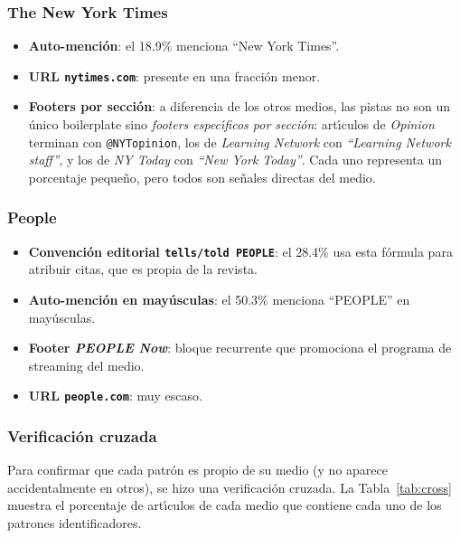 \documentclass[11pt,a4paper]{article}
\begin{document}
\subsubsection*{The New York Times}
\begin{itemize}
    \item \textbf{Auto-menci\'{o}n}: el 18.9\% menciona ``New York Times''.
    \item \textbf{URL \texttt{nytimes.com}}: presente en una fracci\'{o}n menor.
    \item \textbf{Footers por secci\'{o}n}: a diferencia de los otros medios, las pistas no son un \'{u}nico boilerplate sino \textit{footers espec\'{\i}ficos por secci\'{o}n}: art\'{\i}culos de \textit{Opinion} terminan con \texttt{@NYTopinion}, los de \textit{Learning Network} con \textit{``Learning Network staff''}, y los de \textit{NY Today} con \textit{``New York Today''}. Cada uno representa un porcentaje peque\~{n}o, pero todos son se\~{n}ales directas del medio.
\end{itemize}

\subsubsection*{People}
\begin{itemize}
    \item \textbf{Convenci\'{o}n editorial \texttt{tells/told PEOPLE}}: el 28.4\% usa esta f\'{o}rmula para atribuir citas, que es propia de la revista.
    \item \textbf{Auto-menci\'{o}n en may\'{u}sculas}: el 50.3\% menciona ``PEOPLE'' en may\'{u}sculas.
    \item \textbf{Footer \textit{PEOPLE Now}}: bloque recurrente que promociona el programa de streaming del medio.
    \item \textbf{URL \texttt{people.com}}: muy escaso.
\end{itemize}

\subsubsection*{Verificaci\'{o}n cruzada}

Para confirmar que cada patr\'{o}n es propio de su medio (y no aparece accidentalmente en otros), se hizo una verificaci\'{o}n cruzada. La Tabla~\ref{tab:cross} muestra el porcentaje de art\'{\i}culos de cada medio que contiene cada uno de los patrones identificadores.
\end{document}
